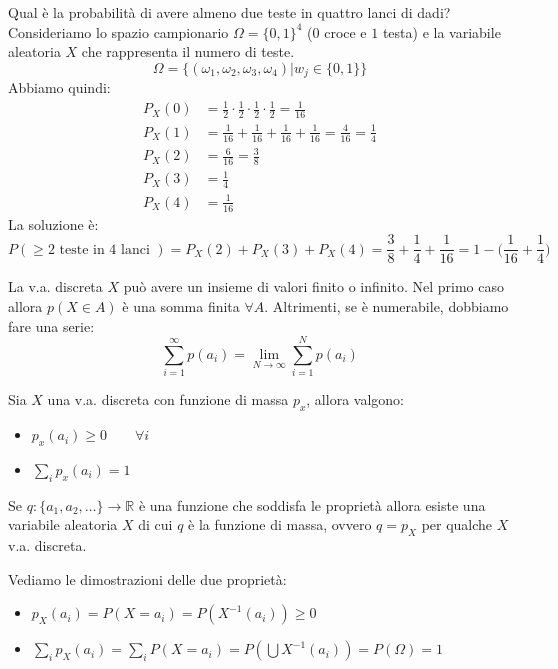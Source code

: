 \begin{example}
	Qual è la probabilità di avere almeno due teste in quattro lanci di dadi?\\
	Consideriamo lo spazio campionario $\Omega = \{0,1\}^4$ ($0$ croce e $1$ testa) e la variabile aleatoria $X$ che rappresenta il numero di teste.
	\begin{equation*}
		\Omega = \{(\omega_1, \omega_2, \omega_3, \omega_4) \vert w_j \in \{0,1\}\}
	\end{equation*}
	Abbiamo quindi:
	\begin{align*}
		P_X(0) & =\frac{1}{2} \cdot \frac{1}{2} \cdot \frac{1}{2} \cdot \frac{1}{2} = \frac{1}{16} \\
		P_X(1) & = \frac{1}{16} + \frac{1}{16} + \frac{1}{16} + \frac{1}{16} = \frac{4}{16} = \frac{1}{4} \\
		P_X(2) & = \frac{6}{16} = \frac{3}{8} \\
		P_X(3) & = \frac{1}{4} \\
		P_X(4) & = \frac{1}{16}
	\end{align*}
	La soluzione è:
	\begin{equation*}
		P(\geq 2 \text{ teste in 4 lanci }) = P_X(2) + P_X(3) + P_X(4) = \frac{3}{8} + \frac{1}{4} + \frac{1}{16} = 1 - \bigg(\frac{1}{16} + \frac{1}{4}\bigg)
	\end{equation*}
\end{example}

\begin{observation}
	La v.a. discreta $X$ può avere un insieme di valori finito o infinito. Nel primo caso allora $p(X\in A)$ è una somma finita $\forall A$. Altrimenti, se è numerabile, dobbiamo fare una serie:
	\begin{equation}
		\sum_{i=1}^{\infty} p(a_i) = \lim_{N \to \infty} \sum_{i=1}^{N}p(a_i)
	\end{equation}
\end{observation}

\begin{proposition}[Proprietà]
	Sia $X$ una v.a. discreta con funzione di massa $p_x$, allora valgono:
	\begin{itemize}
		\item $p_x(a_i) \geq 0 \qquad \forall i$
		\item $\sum_{i}p_x(a_i) = 1$
	\end{itemize}
	Se $q: \{a_1, a_2, \ldots\} \to \mathbb{R}$ è una funzione che soddisfa le proprietà allora esiste una variabile aleatoria $X$ di cui $q$ è la funzione di massa, ovvero $q=p_X$ per qualche $X$ v.a. discreta.
\end{proposition}
\begin{demostration}
	Vediamo le dimostrazioni delle due proprietà:
	\begin{itemize}
		\item $p_X(a_i) = P(X=a_i) = P(X^{-1}(a_i)) \geq 0$
		\item $\sum_{i}p_X(a_i) = \sum_i P(X=a_i) = P(\bigcup X^{-1}(a_i)) = P(\Omega) = 1$
	\end{itemize}
\end{demostration}

